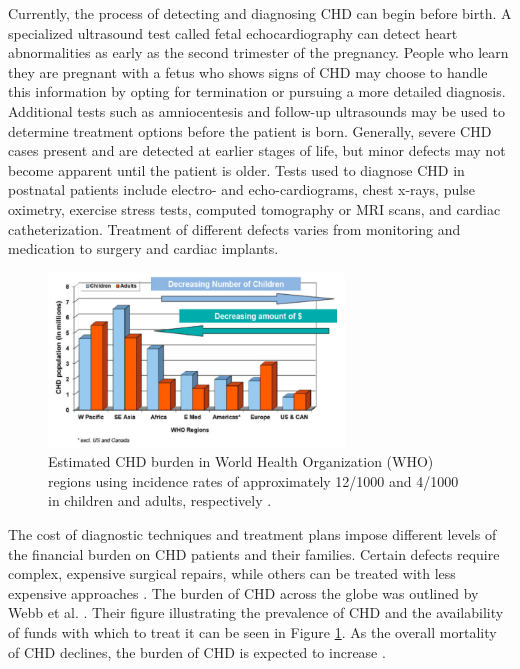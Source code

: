 Currently, the process of detecting and diagnosing CHD can begin before birth. A specialized ultrasound test called fetal echocardiography can detect heart abnormalities as early as the second trimester of the pregnancy. People who learn they are pregnant with a fetus who shows signs of CHD may choose to handle this information by opting for termination or pursuing a more detailed diagnosis. Additional tests such as amniocentesis and follow-up ultrasounds may be used to determine treatment options before the patient is born. Generally, severe CHD cases present and are detected at earlier stages of life, but minor defects may not become apparent until the patient is older. Tests used to diagnose CHD in postnatal patients include electro- and echo-cardiograms, chest x-rays, pulse oximetry, exercise stress tests, computed tomography or MRI scans, and cardiac catheterization. Treatment of different defects varies from monitoring and medication to surgery and cardiac implants.

\begin{figure}
\centering
\includegraphics[width=0.7\textwidth]{5/CHD-burden-webb.png}
\caption{Estimated CHD burden in World Health Organization (WHO) regions using incidence rates of approximately 12/1000 and 4/1000 in children and adults, respectively \cite{Webb2015}.}
\label{ch5:fig:CHD-burden}
\end{figure}

The cost of diagnostic techniques and treatment plans impose different levels of the financial burden on CHD patients and their families. Certain defects require complex, expensive surgical repairs, while others can be treated with less expensive approaches \cite{Mozaffarian2016}. The burden of CHD across the globe was outlined by Webb et al. \cite{Webb2015}. Their figure illustrating the prevalence of CHD and the availability of funds with which to treat it can be seen in Figure \ref{ch5:fig:CHD-burden}. As the overall mortality of CHD declines, the burden of CHD is expected to increase \cite{Mozaffarian2016}.

